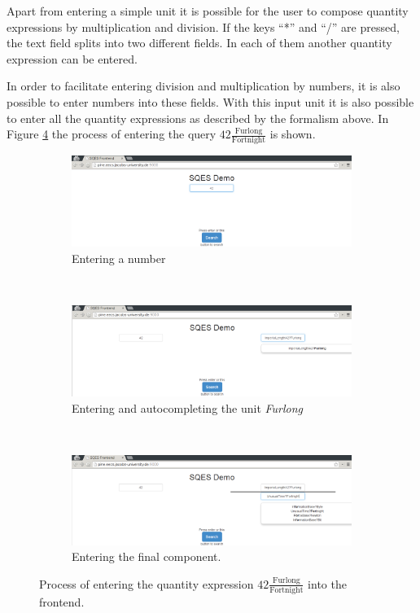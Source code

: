 Apart from entering a simple unit it is possible for the user to compose quantity expressions by multiplication and division. If the keys ``*'' and ``/'' are pressed, the text field splits into two different fields. In each of them another quantity expression can be entered.

In order to facilitate entering division and multiplication by numbers, it is also possible to enter numbers into these fields. With this input unit it is also possible to enter all the quantity expressions as described by the formalism above. In Figure \ref{fig:frontauto} the process of entering the query $42 \frac{\text{Furlong}}{\text{Fortnight}}$ is shown.

\begin{figure}
  \centering
  \begin{subfigure}[b]{0.9\textwidth}
          \includegraphics[width=\textwidth]{img/enter1}
          \caption{Entering a number}
          \label{fig:frontauto1}
  \end{subfigure}
  \\
  \begin{subfigure}[b]{0.9\textwidth}
          \includegraphics[width=\textwidth]{img/enter2}
          \caption{Entering and autocompleting the unit \textit{Furlong}}
          \label{fig:frontauto2}
  \end{subfigure}
  \\
  \begin{subfigure}[b]{0.9\textwidth}
          \includegraphics[width=\textwidth]{img/enter3}
          \caption{Entering the final component. }
          \label{fig:frontauto3}
  \end{subfigure}
  \caption{Process of entering the quantity expression $42 \frac{\text{Furlong}}{\text{Fortnight}}$ into the frontend. }
  \label{fig:frontauto}
\end{figure}

